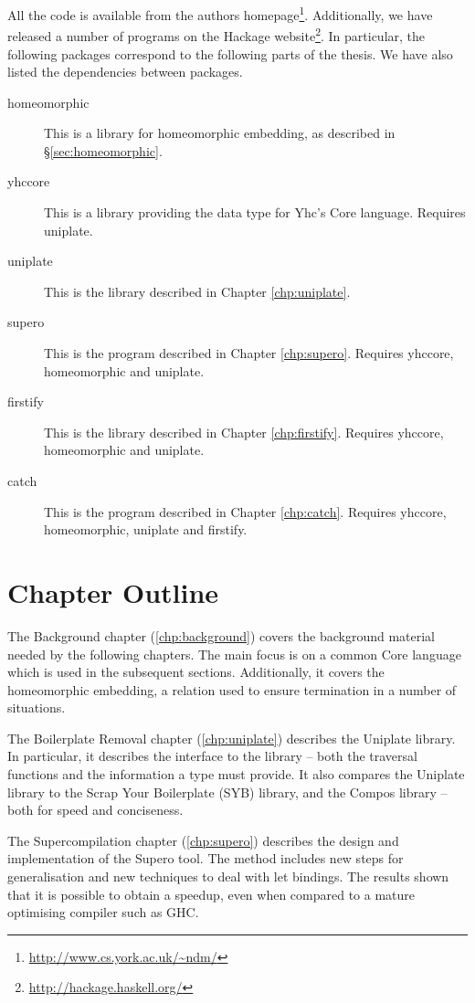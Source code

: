 All the code is available from the authors homepage\footnote{\url{http://www.cs.york.ac.uk/~ndm/}}. Additionally, we have released a number of programs on the Hackage website\footnote{\url{http://hackage.haskell.org/}}. In particular, the following packages correspond to the following parts of the thesis. We have also listed the dependencies between packages.

\begin{description}
\item[homeomorphic] This is a library for homeomorphic embedding, as described in \S\ref{sec:homeomorphic}.
\item[yhccore] This is a library providing the data type for Yhc's Core language. Requires uniplate.
\item[uniplate] This is the library described in Chapter \ref{chp:uniplate}.
\item[supero] This is the program described in Chapter \ref{chp:supero}. Requires yhccore, homeomorphic and uniplate.
\item[firstify] This is the library described in Chapter \ref{chp:firstify}. Requires yhccore, homeomorphic and uniplate.
\item[catch] This is the program described in Chapter \ref{chp:catch}. Requires yhccore, homeomorphic, uniplate and firstify.
\end{description}

\section{Chapter Outline}

The Background chapter (\ref{chp:background}) covers the background material needed by the following chapters. The main focus is on a common Core language which is used in the subsequent sections. Additionally, it covers the homeomorphic embedding, a relation used to ensure termination in a number of situations.

The Boilerplate Removal chapter (\ref{chp:uniplate}) describes the Uniplate library. In particular, it describes the interface to the library -- both the traversal functions and the information a type must provide. It also compares the Uniplate library to the Scrap Your Boilerplate (SYB) library, and the Compos library -- both for speed and conciseness.

The Supercompilation chapter (\ref{chp:supero}) describes the design and implementation of the Supero tool. The method includes new steps for generalisation and new techniques to deal with let bindings. The results shown that it is possible to obtain a speedup, even when compared to a mature optimising compiler such as GHC.

